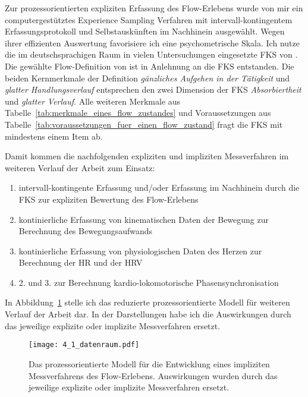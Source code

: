 Zur prozessorientierten expliziten Erfassung des Flow-Erlebens wurde von mir ein computergestütztes Experience Sampling Verfahren mit intervall-kontingentem Erfassungsprotokoll und Selbstauskünften im Nachhinein ausgewählt. Wegen ihrer effizienten Auswertung favorisiere ich eine psychometrische Skala. Ich nutze die im deutschsprachigen Raum in vielen Untersuchungen eingesetzte \ac{FKS} von \citet{Rheinberg2003}. Die gewählte Flow-Definition von \citet{Henk2014} ist in Anlehnung an die \ac{FKS} entstanden. Die beiden Kernmerkmale der Definition \emph{gänzliches Aufgehen in der Tätigkeit} und \emph{glatter Handlungsverlauf} entsprechen den zwei Dimension der \ac{FKS} \emph{Absorbiertheit} und \emph{glatter Verlauf}. Alle weiteren Merkmale aus Tabelle~\ref{tab:merkmale_eines_flow_zustandes} und Voraussetzungen aus Tabelle~\ref{tab:voraussetzungen_fuer_einen_flow_zustand} fragt die \ac{FKS} mit mindestens einem Item ab. 

Damit kommen die nachfolgenden expliziten und impliziten Messverfahren im weiteren Verlauf der Arbeit zum Einsatz:

\begin{enumerate}

	\item intervall-kontingente Erfassung und/oder Erfassung im Nachhinein durch die \ac{FKS} zur expliziten Bewertung des Flow-Erlebens

	\item kontinierliche Erfassung von kinematischen Daten der Bewegung zur Berechnung des Bewegungsaufwands

	\item kontinierliche Erfassung von physiologischen Daten des Herzen zur Berechnung der \ac{HR} und der \ac{HRV}

	\item 2. und 3. zur Berechnung kardio-lokomotorische Phasensynchronisation

\end{enumerate}

In Abbildung~\ref{fig:4_1_datenraum} stelle ich das reduzierte prozessorientierte Modell für weiteren Verlauf der Arbeit dar. In der Darstellungen habe ich die Auswirkungen durch das jeweilige explizite oder implizite Messverfahren ersetzt. 

\begin{figure}[!htb]
	\centering
		\texttt{[image: 4\_1\_datenraum.pdf]}
	\caption[Das prozessorientierte Modell für die Entwicklung eines impliziten Messverfahrens des Flow-Erlebens]{Das prozessorientierte Modell für die Entwicklung eines impliziten Messverfahrens des Flow-Erlebens. Auswirkungen wurden durch das jeweilige explizite oder implizite Messverfahren ersetzt.}
	\label{fig:4_1_datenraum}
\end{figure}

